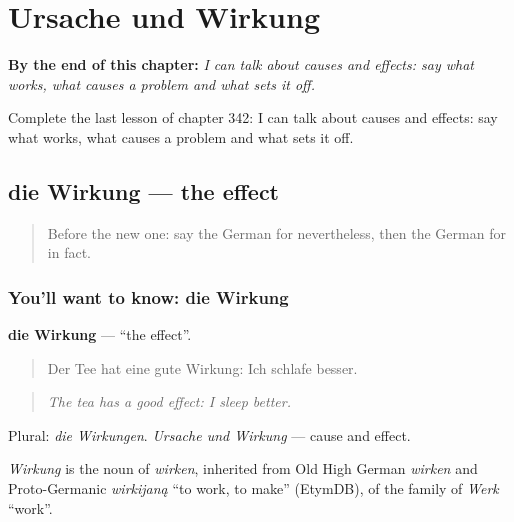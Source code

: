 
\chapter{Ursache und Wirkung}
\label{ch:ge-ursache-und-wirkung}

\begin{chapteropening}
\textbf{By the end of this chapter:} \emph{I can talk about causes and effects: say what works, what causes a problem and what sets it off.}

Complete the last lesson of chapter 342: I can talk about causes and effects: say what works, what causes a problem and what sets it off.
\end{chapteropening}

\section[die Wirkung]{die Wirkung — the effect}

\label{lesson:GE-C342-wirkung}



\begin{quote}
Before the new one: say the German for nevertheless, then the German for in fact.
\end{quote}

\subsection*{You'll want to know: die Wirkung}
\textbf{die Wirkung} — \textquotedblleft{}the effect\textquotedblright{}.

\begin{quote}
Der Tee hat eine gute Wirkung: Ich schlafe besser.
\end{quote}

\begin{quote}
\emph{The tea has a good effect: I sleep better.}
\end{quote}

Plural: \emph{die Wirkungen}. \emph{Ursache und Wirkung} — cause and effect.

\begin{cousinweb}
\emph{Wirkung} is the noun of \emph{wirken}, inherited from Old High German \emph{wirken} and Proto-Germanic \emph{wirkijaną} \textquotedblleft{}to work, to make\textquotedblright{} (EtymDB), of the family of \emph{Werk} \textquotedblleft{}work\textquotedblright{}.
\end{cousinweb}

